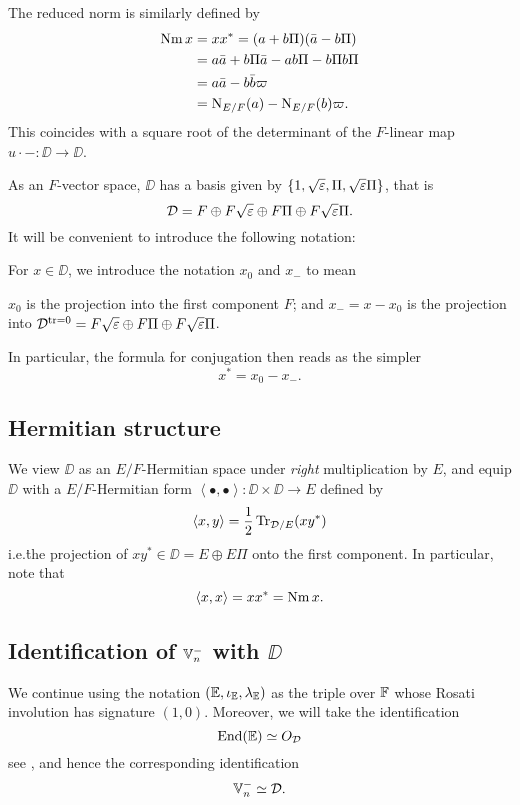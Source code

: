 The reduced norm is similarly defined by
\begin{align*}
  \operatorname{Nm} x &= x x^\ast = (a + b \Pi)(\bar a - b \Pi) \\
  &= a \bar a + b \Pi \bar a - a b \Pi - b \Pi b \Pi \\
  &= a \bar a - b \bar b \varpi \\
  &= \operatorname{N}_{E/F}(a) - \operatorname{N}_{E/F}(b) \varpi .
\end{align*}
This coincides with a square root of
the determinant of the $F$-linear map $u \cdot - \colon \DD \to \DD$.

As an $F$-vector space, $\DD$ has a basis given by
$\{1, \sqrt{\varepsilon}, \Pi, \sqrt{\varepsilon}\Pi\}$, that is
\[ \mathcal D = F \oplus F\sqrt{\varepsilon} \oplus F \Pi \oplus F\sqrt{\varepsilon}\Pi. \]
It will be convenient to introduce the following notation:
\begin{definition}
  For $x \in \DD$, we introduce the notation $x_0$ and $x_-$ to mean
  \begin{itemize}
    \ii $x_0$ is the projection into the first component $F$; and
    \ii $x_- = x - x_0$ is the projection into
    $\mathcal D^{\operatorname{tr} = 0} = F\sqrt{\varepsilon} \oplus F \Pi \oplus F\sqrt{\varepsilon}\Pi$.
  \end{itemize}
\end{definition}
In particular, the formula for conjugation then reads as the simpler
\[ x^\ast = x_0 - x_-. \]

\subsection{Hermitian structure}
We view $\DD$ as an $E/F$-Hermitian space under \emph{right} multiplication by $E$,
and equip $\DD$ with a $E/F$-Hermitian form
$\left\langle \bullet, \bullet \right\rangle \colon \DD \times \DD \to E$
defined by
\[ \left\langle x,y \right\rangle = \frac{1}{2} \operatorname{Tr}_{\mathcal D/E}(xy^\ast) \]
i.e.\. the projection of $xy^\ast \in \DD = E \oplus E\Pi$ onto the first component.
In particular, note that
\[ \left\langle x,x \right\rangle  = x x^\ast = \operatorname{Nm} x. \]

\subsection{Identification of $\mathbb V_n^-$ with $\DD$}
We continue using the notation $(\mathbb E, \iota_\mathbb E, \lambda_\mathbb E)$ as the triple over $\mathbb F$
whose Rosati involution has signature $(1,0)$.
Moreover, we will take the identification
\[ \operatorname{End}(\mathbb E) \simeq O_\mathcal D \]
see \cite[Remark 2.5]{ref:KR},
and hence the corresponding identification
\[ \mathbb V_n^- \simeq \mathcal D. \]

